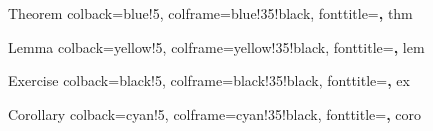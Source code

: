     {Theorem}%
    {%
        colback=blue!5,
        colframe=blue!35!black,
        fonttitle=\bfseries,
    }%
    {thm}%

    {Lemma}%
    {%
        colback=yellow!5,
        colframe=yellow!35!black,
        fonttitle=\bfseries,
    }%
    {lem} %

    {Exercise}%
    {%
        colback=black!5,
        colframe=black!35!black,
        fonttitle=\bfseries,
    }%
    {ex}%

    {Corollary}%
    {%
        colback=cyan!5,
        colframe=cyan!35!black,
        fonttitle=\bfseries,
    }%
    {coro} %

\theoremstyle{proof}
\newtheorem*{pf*}{Proof}
\newenvironment{proof*}{
\begin{pf*}
}{
\hfill $\square{}$.
\end{pf*}
}

\theoremstyle{proof}
\newtheorem*{sol*}{Solution}
\newenvironment{solution*}{
\begin{sol*}
}{
\hfill $\square{}$.
\end{sol*}
}

\theoremstyle{definition}
\addto\captionsenglish{ \renewcommand{\listtheoremname}{B \ List of Definitions} }
\newenvironment{definition}{\begin{shaded}\begin{dfn}}{\end{dfn}\end{shaded}}

\newcommand{\1}[1]{\mathmybb{\bf 1}_{\{#1\}}}

\newcommand{\bigSquare}[1]{
\Big[ #1 \Big]
}
\newcommand{\biggSquare}[1]{
\Bigg[ #1 \Bigg]
}

\newcommand{\bigRound}[1]{
\Big( #1 \Big)
}
\newcommand{\biggRound}[1]{
\Bigg( #1 \Bigg)
}

\newcommand{\bigCurl}[1]{
\Big\{ #1 \Big\}
}
\newcommand{\biggCurl}[1]{
\Bigg\{ #1 \Bigg\}
}

